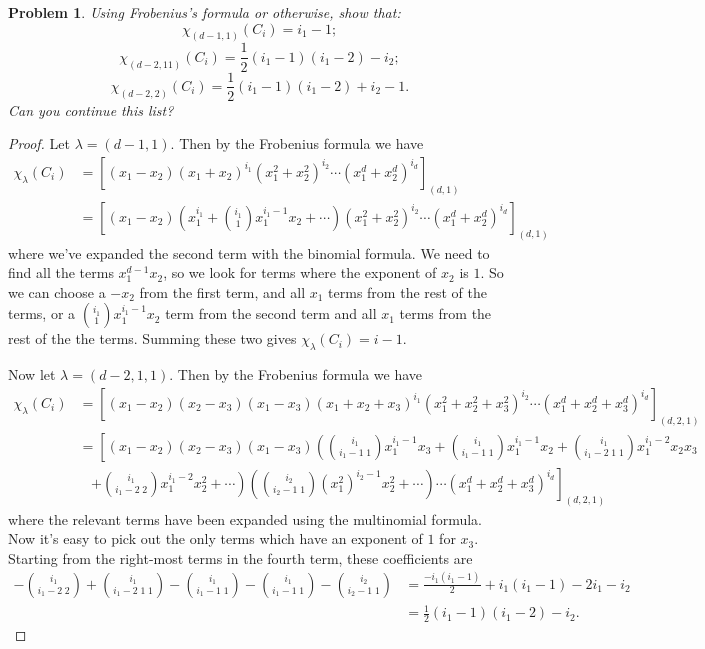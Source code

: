 \documentclass{article}
\newtheorem{problem}{Problem}
\begin{document}
\begin{problem}
\label{formula}
Using Frobenius's formula or otherwise, show that:
\[
\chi_{(d-1,1)}(C_i) = i_1 - 1;
\]
\[
\chi_{(d-2, 1 1)}(C_i) = \frac{1}{2} (i_1 - 1)(i_1 - 2) - i_2;
\]
\[
\chi_{(d-2, 2)}(C_i) = \frac{1}{2} (i_1 - 1)(i_1 - 2) + i_2 - 1.
\]
Can you continue this list?
\end{problem}
\begin{proof}
Let $\lambda = (d-1,1)$. Then by the Frobenius formula we have
\begin{align*}
\chi_{\lambda}(C_i)
&= \left [ (x_1 - x_2)(x_1 + x_2)^{i_1}(x_1^2 + x_2^2)^{i_2} \cdots (x_1^d + x_2^d)^{i_d} \right ]_{(d,1)}\\
&= \left [ (x_1 - x_2) \left (x_1^{i_1} + \binom{i_1}{1} x_1^{i_1-1}x_2 + \cdots \right)(x_1^2 + x_2^2)^{i_2} \cdots (x_1^d + x_2^d)^{i_d} \right ]_{(d,1)}
\end{align*}
where we've expanded the second term with the binomial formula. We need to find all the terms $x_1^{d-1}x_2$, so we look for terms where the exponent of $x_2$ is $1$. So we can choose a $-x_2$ from the first term, and all $x_1$ terms from the rest of the terms, or a $\binom{i_1}{1}x_1^{i_1-1}x_2$ term from the second term and all $x_1$ terms from the rest of the the terms. Summing these two gives $\chi_{\lambda}(C_i) = i-1$.

Now let $\lambda = (d-2,1,1)$. Then by the Frobenius formula we have
\begin{align*}
\chi_{\lambda}(C_i)
&= \left [ (x_1 - x_2)(x_2 - x_3)(x_1 - x_3)(x_1 + x_2 + x_3)^{i_1}(x_1^2 + x_2^2 + x_3^2)^{i_2} \cdots (x_1^d + x_2^d + x_3^d)^{i_d} \right ]_{(d,2,1)}\\
&= \left [ (x_1 - x_2)(x_2 - x_3)(x_1 - x_3) \left (\binom{i_1}{i_1 - 1 \; 1} x_1^{i_1-1}x_3 + \binom{i_1}{i_1-1 \; 1} x_1^{i_1-1}x_2 + \binom{i_1}{i_1-2 \; 1 \; 1} x_1^{i_1-2}x_2x_3 \right. \right.\\
& ~~~~\left .\left.+ \binom{i_1}{i_1-2 \; 2}x_1^{i_1-2}x_2^2 + \cdots \right ) \left (\binom{i_2}{i_2-1 \; 1} (x_1^2)^{i_2-1}x_2^2 + \cdots \right ) \cdots (x_1^d + x_2^d + x_3^d)^{i_d} \right ]_{(d,2,1)}
\end{align*}
where the relevant terms have been expanded using the multinomial formula. Now it's easy to pick out the only terms which have an exponent of $1$ for $x_3$. Starting from the right-most terms in the fourth term, these coefficients are
\begin{align*}
-\binom{i_1}{i_1-2 \; 2} + \binom{i_1}{i_1-2 \; 1 \; 1} - \binom{i_1}{i_1-1 \; 1} - \binom{i_1}{i_1-1 \; 1} - \binom{i_2}{i_2-1 \; 1}
&= \frac{-i_1(i_1-1)}{2} + i_1(i_1-1) - 2i_1 - i_2\\
&= \frac{1}{2}(i_1-1)(i_1-2)-i_2.
\end{align*}


\end{proof}
\end{document}
